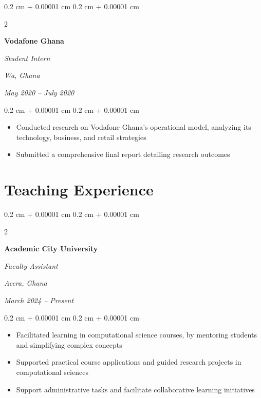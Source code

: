 \documentclass[10pt, letterpaper]{article}
\newenvironment{highlights}{
    \begin{itemize}[
        topsep=0.10 cm,
        parsep=0.10 cm,
        partopsep=0pt,
        itemsep=0pt,
        leftmargin=0.4 cm + 10pt
    ]
}{
    \end{itemize}
} %
\newenvironment{onecolentry}{
    \begin{adjustwidth}{
        0.2 cm + 0.00001 cm
    }{
        0.2 cm + 0.00001 cm
    }
}{
    \end{adjustwidth}
} %
\newenvironment{twocolentry}[2][]{
    \onecolentry
    \def\secondColumn{#2}
    \setcolumnwidth{\fill, 4.5 cm}
    \begin{paracol}{2}
}{
    \switchcolumn \raggedleft \secondColumn
    \end{paracol}
    \endonecolentry
} %
\begin{document}
        \vspace{0.2 cm}
        
        \begin{twocolentry}{
        \textit{Wa, Ghana}    
            
        \textit{May 2020 – July 2020}}
            \textbf{Vodafone Ghana}
            
            \textit{Student Intern}
        \end{twocolentry}

        \vspace{0.10 cm}
        \begin{onecolentry}
            \begin{highlights}
                \item Conducted research on Vodafone Ghana's operational model, analyzing its technology, business, and retail strategies
                \item Submitted a comprehensive final report detailing research outcomes
            \end{highlights}
        \end{onecolentry}

    
    \section{Teaching Experience}
        
        \begin{twocolentry}{
        \textit{Accra, Ghana}    
            
        \textit{March 2024 – Present}}
            \textbf{Academic City University}
            
            \textit{Faculty Assistant}
        \end{twocolentry}

        \vspace{0.10 cm}
        \begin{onecolentry}
            \begin{highlights}
                \item Facilitated learning in computational science courses, by mentoring students and simplifying complex concepts
                \item Supported practical course applications and guided research projects in computational sciences
                \item Support administrative tasks and facilitate collaborative learning initiatives
            \end{highlights}
        \end{onecolentry}
\end{document}
